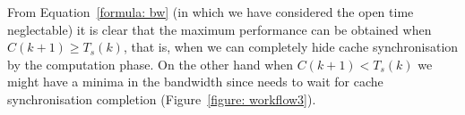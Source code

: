 From Equation~\ref{formula: bw} (in which we have considered the open time neglectable) it is clear that the maximum performance can be obtained when $C(k+1) \geq T_s(k)$, that is, when we can completely hide cache synchronisation by the computation phase. On the other hand when $C(k+1) < T_s(k)$ we might have a minima in the bandwidth since  needs to wait for cache synchronisation completion (Figure~\ref{figure: workflow3}). 
